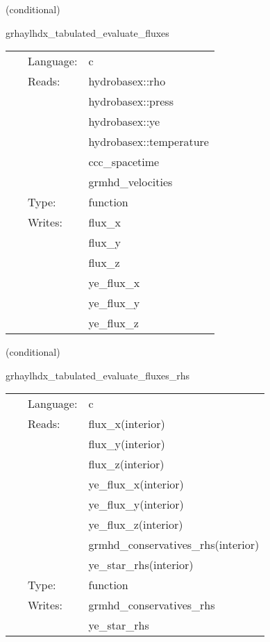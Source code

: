 \documentclass{article}
\begin{document}
\vspace{5mm}

   (conditional) 

\hspace{5mm} grhaylhdx\_tabulated\_evaluate\_fluxes 

\hspace{5mm}{\it tabulated version of grhaylhdx\_evaluate\_fluxes } 


\hspace{5mm}

 \begin{tabular*}{160mm}{cll} 
~ & Language:  & c \\ 
~ & Reads:  & hydrobasex::rho \\ 
~& ~ &hydrobasex::press\\ 
~& ~ &hydrobasex::ye\\ 
~& ~ &hydrobasex::temperature\\ 
~& ~ &ccc\_spacetime\\ 
~& ~ &grmhd\_velocities\\ 
~ & Type:  & function \\ 
~ & Writes:  & flux\_x \\ 
~& ~ &flux\_y\\ 
~& ~ &flux\_z\\ 
~& ~ &ye\_flux\_x\\ 
~& ~ &ye\_flux\_y\\ 
~& ~ &ye\_flux\_z\\ 
\end{tabular*} 


\vspace{5mm}

   (conditional) 

\hspace{5mm} grhaylhdx\_tabulated\_evaluate\_fluxes\_rhs 

\hspace{5mm}{\it tabulated version of grhaylhdx\_evaluate\_fluxes\_rhs } 


\hspace{5mm}

 \begin{tabular*}{160mm}{cll} 
~ & Language:  & c \\ 
~ & Reads:  & flux\_x(interior) \\ 
~& ~ &flux\_y(interior)\\ 
~& ~ &flux\_z(interior)\\ 
~& ~ &ye\_flux\_x(interior)\\ 
~& ~ &ye\_flux\_y(interior)\\ 
~& ~ &ye\_flux\_z(interior)\\ 
~& ~ &grmhd\_conservatives\_rhs(interior)\\ 
~& ~ &ye\_star\_rhs(interior)\\ 
~ & Type:  & function \\ 
~ & Writes:  & grmhd\_conservatives\_rhs \\ 
~& ~ &ye\_star\_rhs\\ 
\end{tabular*} 
\end{document}
